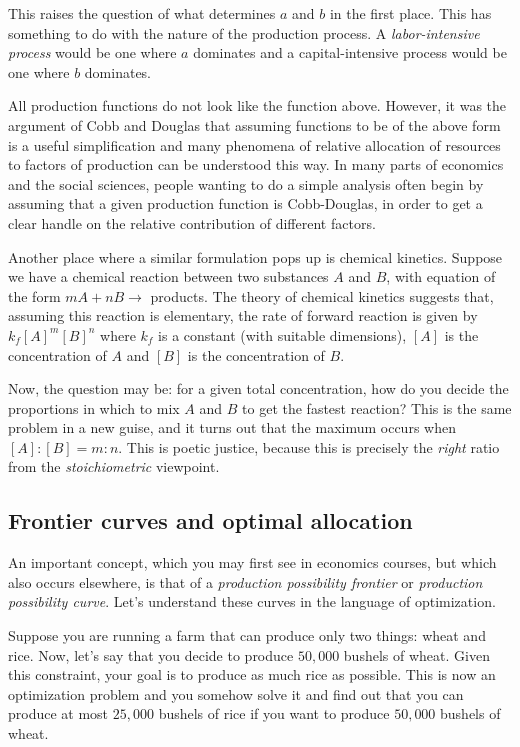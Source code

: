 \documentclass[10pt]{amsart}
\begin{document}
This raises the question of what determines $a$ and $b$ in the first
place. This has something to do with the nature of the production
process. A {\em labor-intensive process} would be one where $a$
dominates and a capital-intensive process would be one where $b$
dominates.

All production functions do not look like the function above. However,
it was the argument of Cobb and Douglas that assuming functions to be
of the above form is a useful simplification and many phenomena of
relative allocation of resources to factors of production can be
understood this way. In many parts of economics and the social
sciences, people wanting to do a simple analysis often begin by
assuming that a given production function is Cobb-Douglas, in order to
get a clear handle on the relative contribution of different factors.

Another place where a similar formulation pops up is chemical
kinetics. Suppose we have a chemical reaction between two substances
$A$ and $B$, with equation of the form $mA + nB \to $ products. The
theory of chemical kinetics suggests that, assuming this reaction is
elementary, the rate of forward reaction is given by $k_f[A]^m[B]^n$
where $k_f$ is a constant (with suitable dimensions), $[A]$ is the
concentration of $A$ and $[B]$ is the concentration of $B$.

Now, the question may be: for a given total concentration, how do you
decide the proportions in which to mix $A$ and $B$ to get the fastest
reaction? This is the same problem in a new guise, and it turns out
that the maximum occurs when $[A]:[B] = m:n$. This is poetic justice,
because this is precisely the {\em right} ratio from the
{\em stoichiometric} viewpoint.

\subsection{Frontier curves and optimal allocation}

An important concept, which you may first see in economics courses,
but which also occurs elsewhere, is that of a {\em production
possibility frontier} or {\em production possibility curve}. Let's
understand these curves in the language of optimization.

Suppose you are running a farm that can produce only two things: wheat
and rice. Now, let's say that you decide to produce $50,000$ bushels
of wheat. Given this constraint, your goal is to produce as much rice
as possible. This is now an optimization problem and you somehow solve
it and find out that you can produce at most $25,000$ bushels of rice
if you want to produce $50,000$ bushels of wheat.
\end{document}
